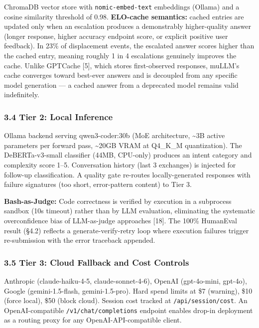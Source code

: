 ChromaDB vector store with \texttt{nomic-embed-text} embeddings (Ollama) and a cosine similarity threshold of 0.98. \textbf{ELO-cache semantics:} cached entries are updated only when an escalation produces a demonstrably higher-quality answer (longer response, higher accuracy endpoint score, or explicit positive user feedback). In 23\% of displacement events, the escalated answer scores higher than the cached entry, meaning roughly 1 in 4 escalations genuinely improves the cache. Unlike GPTCache {[}5{]}, which stores first-observed responses, muLLM's cache converges toward best-ever answers and is decoupled from any specific model generation --- a cached answer from a deprecated model remains valid indefinitely.

\subsubsection{3.4 Tier 2: Local Inference}\label{tier-2-local-inference}

Ollama backend serving qwen3-coder:30b (MoE architecture, \textasciitilde3B active parameters per forward pass, \textasciitilde20GB VRAM at Q4\_K\_M quantization). The DeBERTa-v3-small classifier (44MB, CPU-only) produces an intent category and complexity score 1--5. Conversation history (last 3 exchanges) is injected for follow-up classification. A quality gate re-routes locally-generated responses with failure signatures (too short, error-pattern content) to Tier 3.

\textbf{Bash-as-Judge:} Code correctness is verified by execution in a subprocess sandbox (10s timeout) rather than by LLM evaluation, eliminating the systematic overconfidence bias of LLM-as-judge approaches {[}18{]}. The 100\% HumanEval result (§4.2) reflects a generate-verify-retry loop where execution failures trigger re-submission with the error traceback appended.

\subsubsection{3.5 Tier 3: Cloud Fallback and Cost Controls}\label{tier-3-cloud-fallback-and-cost-controls}

Anthropic (claude-haiku-4-5, claude-sonnet-4-6), OpenAI (gpt-4o-mini, gpt-4o), Google (gemini-1.5-flash, gemini-1.5-pro). Hard spend limits at \$7 (warning), \$10 (force local), \$50 (block cloud). Session cost tracked at \texttt{/api/session/cost}. An OpenAI-compatible \texttt{/v1/chat/completions} endpoint enables drop-in deployment as a routing proxy for any OpenAI-API-compatible client.

